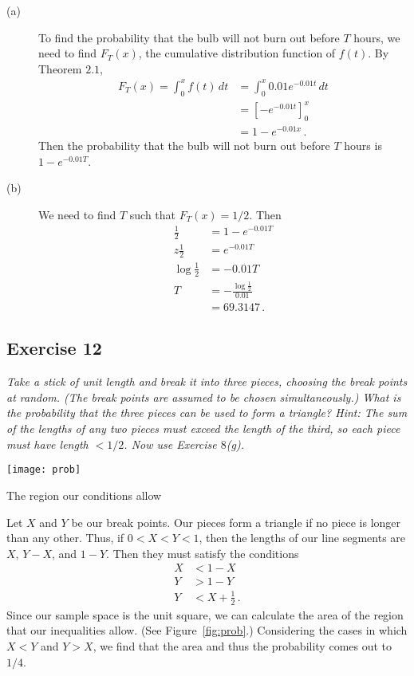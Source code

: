 \documentclass{tufte-handout}
\begin{document}
\begin{description}
\item [(a)] To find the probability that the bulb will not burn out
  before $T$ hours, we need to find $F_T(x)$, the cumulative distribution
  function of $f(t)$. By Theorem $2.1$,
  \begin{align*}
    F_T(x) = \int_{0}^x \! f(t) \, dt &= \int_{0}^x \!
    0.01 e^{-0.01 t} \, dt \\
    &= \left[ -e^{-0.01t} \right]_0^x \\
    &= 1 - e^{-0.01x} \, .
  \end{align*}
  Then the probability that the bulb will not burn out before $T$
  hours is $1-e^{-0.01T}$.
\item [(b)] We need to find $T$ such that $F_T(x) = 1/2$. Then
  \begin{align*}
    \frac{1}{2} &= 1 - e^{-0.01T} \\z
    \frac{1}{2} &= e^{-0.01T} \\
    \log{\frac{1}{2}} &= -0.01T \\
    T &= -\frac{\log{\frac{1}{2}}}{0.01} \\
    &= 69.3147 \, .
  \end{align*}
\end{description}

\subsection{Exercise 12}
\begin{description}
\item \emph{Take a stick of unit length and break it into three
    pieces, choosing the break points at random. (The break points are
    assumed to be chosen simultaneously.) What is the probability that
    the three pieces can be used to form a triangle? \emph{Hint}: The
    sum of the lengths of any two pieces must exceed the length of the
    third, so each piece must have length $< 1/2$. Now use Exercise $8$(g).}
\end{description}

\begin{marginfigure}
  \texttt{[image: prob]}
  \caption{The region our conditions allow}
  \label{fig:prob}
\end{marginfigure}

Let $X$ and $Y$ be our break points. Our pieces form a triangle if no
piece is longer than any other. Thus, if $0<X<Y<1$, then the lengths
of our line segments are $X$, $Y-X$, and $1-Y$. Then they must satisfy
the conditions
\begin{align*}
  X &< 1 - X \\
  Y &> 1 - Y \\
  Y &< X + \frac{1}{2} \, .
\end{align*}
Since our sample space is the unit square, we can calculate the area
of the region that our inequalities allow. (See
Figure~\ref{fig:prob}.) Considering the cases in which $X<Y$ and
$Y>X$, we find that the area and thus the probability comes out to
$1/4$.
\end{document}
